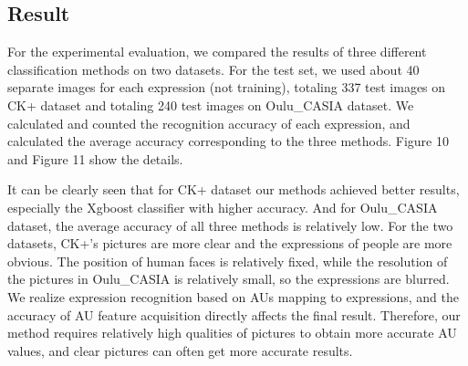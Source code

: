 \documentclass[10pt, conference, compsocconf]{IEEEtran}
\begin{document}
\subsection{Result}

For the experimental evaluation, we compared the results of three different classification methods on two datasets. For the test set, we used about 40 separate images for each expression (not training), totaling 337 test images on CK+ dataset and totaling 240 test images on Oulu\_CASIA dataset. We calculated and counted the recognition accuracy of each expression, and calculated the average accuracy corresponding to the three methods. Figure 10 and Figure 11 show the details.

It can be clearly seen that for CK+ dataset our methods achieved better results, especially the Xgboost classifier with higher accuracy. And for Oulu\_CASIA dataset, the average accuracy of all three methods is relatively low. For the two datasets, CK+'s pictures are more clear and the expressions of people are more obvious. The position of human faces is relatively fixed, while the resolution of the pictures in Oulu\_CASIA is relatively small, so the expressions are blurred. We realize expression recognition based on AUs mapping to expressions, and the accuracy of AU feature acquisition directly affects the final result. Therefore, our method requires relatively high qualities of pictures to obtain more accurate AU values, and clear pictures can often get more accurate results.
\end{document}
